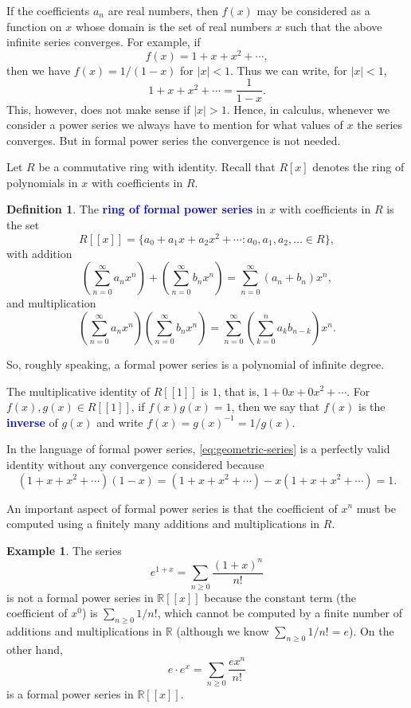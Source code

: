 \documentclass[oneside]{book}
\numberwithin{equation}{section}
\theoremstyle{definition}
\newtheorem{exam}[thm]{Example}
\newtheorem{defn}[thm]{Definition}
\newcommand{\RR}{\mathbb{R}}
\renewcommand\emph[1]{\textcolor{blue}{\bf #1}}
\begin{document}
If the coefficients \( a_n \) are real numbers, then \( f(x) \) may be considered as
a function on \( x \) whose domain is the set of real numbers \( x \)
such that the above infinite series converges. For example, if
\[
  f(x) = 1+x+x^2 + \cdots,
\]
then we have \( f(x) = 1/(1-x) \) for \( |x|<1 \). Thus we can write,
for \( |x|<1 \),
\begin{equation}\label{eq:geometric-series}
  1+x+x^2 + \cdots = \frac{1}{1-x}.
\end{equation}
This, however, does not make sense if \( |x|>1 \). Hence, in calculus,
whenever we consider a power series we always have to mention for what
values of \( x \) the series converges. But in formal power series the
convergence is not needed.

Let \( R \) be a commutative ring with identity. Recall that
\( R[x] \) denotes the ring of polynomials in \( x \) with
coefficients in \( R \).

\begin{defn}
  The \emph{ring of formal power series} in \( x \) with coefficients
  in \( R \) is the set
\[
  R[[x]] = \{a_0 + a_1 x + a_2x^2 + \cdots : a_0,a_1,a_2,\ldots \in R \},
\]
with addition
\[
  \left( \sum_{n=0}^\infty a_n x^n \right) + \left( \sum_{n=0}^\infty
    b_n x^n \right) = \sum_{n=0}^\infty (a_n+b_n) x^n ,
\]
and multiplication
\[
  \left( \sum_{n=0}^\infty a_n x^n \right) \left( \sum_{n=0}^\infty
    b_n x^n \right) = \sum_{n=0}^\infty \left( \sum_{k=0}^n a_k
    b_{n-k} \right)x^n.
\]
\end{defn}

So, roughly speaking, a formal power series is a polynomial of
infinite degree.

The multiplicative identity of \( R[[1]] \) is \( 1 \), that is,
\( 1+0x+0x^2+\cdots \). For \( f(x),g(x) \in R[[1]] \), if
\( f(x) g(x) = 1 \), then we say that \( f(x) \) is the \emph{inverse}
of \( g(x) \) and write \( f(x) = g(x)^{-1} = 1/g(x) \).

In the language of formal power series, \eqref{eq:geometric-series} is
a perfectly valid identity without any convergence considered because
\[
  (1+x+x^2 + \cdots)(1-x) = (1+x+x^2 + \cdots) - x(1+x+x^2 + \cdots) = 1.
\]

An important aspect of formal power series is that the coefficient of
\( x^n \) must be computed using a finitely many additions and
multiplications in \( R \).


\begin{exam}
  The series
\[
  e^{1+x} = \sum_{n\ge 0} \frac{(1+x)^n}{n!}
\]
is not a formal power series in \( \RR[[x]] \) because the constant
term (the coefficient of \( x^0 \)) is \( \sum_{n\ge0} 1/n! \), which
cannot be computed by a finite number of additions and multiplications
in \( \RR \) (although we know \( \sum_{n\ge0} 1/n! = e \)). On the
other hand,
\[
  e\cdot e^{x} = \sum_{n\ge 0} \frac{e x^n}{n!}
\]
is a formal power series in \( \RR[[x]] \). 
\end{exam}
\end{document}
